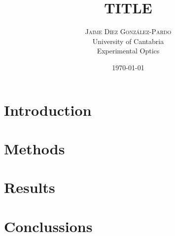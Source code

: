 \documentclass[twoside]{article}
\title{
	\vspace{-15mm}
	\fontsize{28pt}{10pt}
	\selectfont\textbf{TITLE}%
}
\author{
	\large
	\textsc{Jaime Díez González-Pardo}\\[4mm]%
	\fontsize{28pt}{10pt} University of Cantabria \\ %
	\normalsize Experimental Optics \\ 
}
\date{ \today }
\begin{document}
	\maketitle %


	\thispagestyle{fancy} %


	\begin{abstract}

		\noindent%

	\end{abstract}


	\begin{multicols}{2} %

		\section{Introduction} %

			

		\section{Methods}

			

		\section{Results}



		\section{Conclussions}

	\end{multicols}





\end{document}
